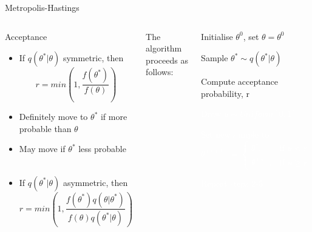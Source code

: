 \documentclass[compress]{beamer}
\begin{document}
\begin{frame}[label=sec-7-9]{Metropolis-Hastings}
    \begin{columns}[c] 
    \begin{block}{Acceptance}
        \begin{itemize}
            \item If $q(\theta^*|\theta)$ symmetric, then 
            $$ r = min \left( 1,\dfrac{f(\theta^*)}{f(\theta)} \right)$$ 
            \item Definitely move to $\theta^*$ if more probable than $\theta$ 
            \item May move if $\theta^*$ less probable \\~\\
            \item If $q(\theta^*|\theta)$ asymmetric, then $$ r = min \left( 1,\dfrac{f(\theta^*)q(\theta|\theta^*)}{f(\theta)q(\theta^*|\theta)} \right)$$
        \end{itemize}
    \end{block}

    The algorithm proceeds as follows:\\
    \begin{enumerate}
        \item Initialise $\theta^{0}$, set $\theta = \theta^{0}$
        \item Sample $\theta^* \sim q(\theta^*|\theta)$
        \item Compute acceptance probability, r
        \textcolor{white}{
            \item[\color{white}] Draw $u \sim Uniform[0,1]$
            \item[\color{white}] Set new sample to 
            \[
               \theta^{(s+1)} = 
               \begin{cases}
                \theta^*, & \text{if } u < r\\
                \theta^{(s)}, & \text{if } u \geqslant r
            \end{cases}
        \]
        \item[\color{white}] Repeat steps 2-5
    }
\end{enumerate}
\end{columns}
\end{frame}
\end{document}
